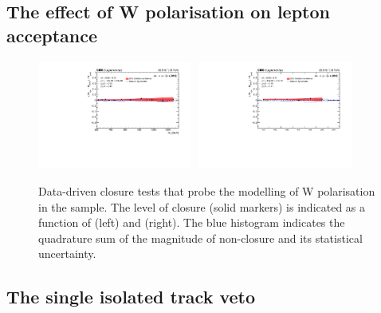 \clearpage
\subsection{The effect of W polarisation on lepton acceptance}

\begin{figure}[h!]
  \begin{center}
    \includegraphics[width=0.45\textwidth]{figures/closureTests/WPol/SingleMuPlus_to_SingleMuMinus_ht.pdf}~
    \includegraphics[width=0.45\textwidth]{figures/closureTests/WPol/SingleMuPlus_to_SingleMuMinus_nJet.pdf}\\
    \caption{Data-driven closure tests that probe the modelling of W
      polarisation in the \mj sample. The level of closure (solid
      markers) is indicated as a function of \scalht (left) and \njet
      (right). The blue histogram indicates the quadrature sum of the
      magnitude of non-closure and its statistical uncertainty. }
    \label{fig:closure_WPol_mu}
  \end{center} 
\end{figure}

\clearpage
\subsection{The single isolated track veto}

